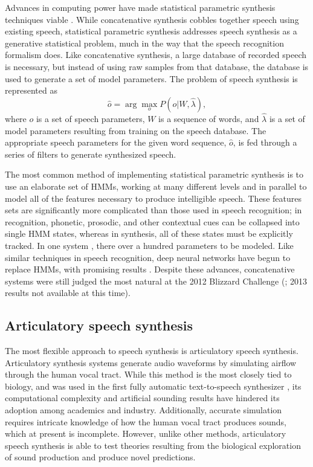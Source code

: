 \documentclass{article}
\begin{document}
Advances in computing power
have made statistical parametric synthesis
techniques viable \citep{zen2009}.
While concatenative synthesis
cobbles together speech using existing speech,
statistical parametric synthesis
addresses speech synthesis
as a generative statistical problem,
much in the way that
the speech recognition formalism does.
Like concatenative synthesis,
a large database of recorded speech is necessary,
but instead of using
raw samples from that database,
the database is used to generate
a set of model parameters.
The problem of speech synthesis
is represented as
\begin{equation}
  \hat{o} = \arg \max_o P(o|W, \hat{\lambda}),
\end{equation}
where $o$ is a set of speech parameters,
$W$ is a sequence of words,
and $\hat{\lambda}$ is a set of model parameters
resulting from training on the speech database.
The appropriate speech parameters
for the given word sequence, $\hat{o}$,
is fed through a series of filters
to generate synthesized speech.

The most common method of implementing
statistical parametric synthesis
is to use an elaborate set of HMMs,
working at many different levels
and in parallel to model
all of the features necessary to produce
intelligible speech.
These features sets are significantly
more complicated than those
used in speech recognition;
in recognition, phonetic, prosodic,
and other contextual cues
can be collapsed into single HMM states,
whereas in synthesis,
all of these states must be explicitly tracked.
In one system \citep{zen2007},
there over a hundred parameters to be modeled.
Like similar techniques in speech recognition,
deep neural networks have begun
to replace HMMs, with promising results
\citep{zen2013}.
Despite these advances, concatenative systems
were still judged the most natural
at the 2012 Blizzard Challenge
(\citealp{kinga2012};
2013 results not available at this time).

\subsection{Articulatory speech synthesis}
\label{subsec:articulatory}

The most flexible approach to speech synthesis
is articulatory speech synthesis.
Articulatory synthesis systems generate
audio waveforms by simulating
airflow through the human vocal tract.
While this method is
the most closely tied to biology,
and was used in the first fully automatic
text-to-speech synthesizer \citep{klatt1987},
its computational complexity
and artificial sounding results
have hindered its adoption
among academics and industry.
Additionally, accurate simulation
requires intricate knowledge
of how the human vocal tract
produces sounds,
which at present is incomplete.
However, unlike other methods,
articulatory speech synthesis
is able to test theories
resulting from the biological exploration
of sound production
and produce novel predictions.
\end{document}

